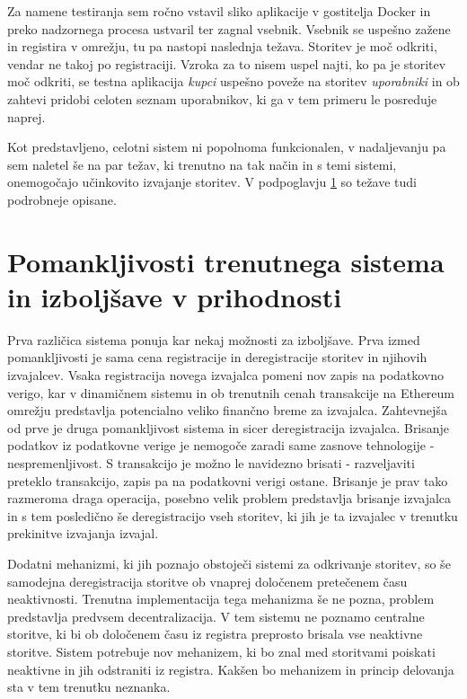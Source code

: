 \documentclass[a4paper, 12pt]{book}
\begin{document}
Za namene testiranja sem ročno vstavil sliko aplikacije v gostitelja Docker in preko nadzornega procesa ustvaril ter zagnal vsebnik.
Vsebnik se uspešno zažene in registira v omrežju, tu pa nastopi naslednja težava.
Storitev je moč odkriti, vendar ne takoj po registraciji.
Vzroka za to nisem uspel najti, ko pa je storitev moč odkriti, se testna aplikacija \textit{kupci} uspešno poveže na storitev \textit{uporabniki} in ob zahtevi pridobi celoten seznam uporabnikov, ki ga v tem primeru le posreduje naprej.

Kot predstavljeno, celotni sistem ni popolnoma funkcionalen, v nadaljevanju pa sem naletel še na par težav, ki trenutno na tak način in s temi sistemi, onemogočajo učinkovito izvajanje storitev.
V podpoglavju \ref{improvments} so težave tudi podrobneje opisane.


\section{Pomankljivosti trenutnega sistema in izboljšave v prihodnosti}
\label{improvments}

Prva različica sistema ponuja kar nekaj možnosti za izboljšave.
Prva izmed pomankljivosti je sama cena registracije in deregistracije storitev in njihovih izvajalcev.
Vsaka registracija novega izvajalca pomeni nov zapis na podatkovno verigo, kar v dinamičnem sistemu in ob trenutnih cenah transakcije na Ethereum omrežju predstavlja potencialno veliko finančno breme za izvajalca.
Zahtevnejša od prve je druga pomankljivost sistema in sicer deregistracija izvajalca.
Brisanje podatkov iz podatkovne verige je nemogoče zaradi same zasnove tehnologije - nespremenljivost.
S transakcijo je možno le navidezno brisati - razveljaviti preteklo transakcijo, zapis pa na podatkovni verigi ostane.
Brisanje je prav tako razmeroma draga operacija, posebno velik problem predstavlja brisanje izvajalca in s tem posledično še deregistracijo vseh storitev, ki jih je ta izvajalec v trenutku prekinitve izvajanja izvajal.

Dodatni mehanizmi, ki jih poznajo obstoječi sistemi za odkrivanje storitev, so še samodejna deregistracija storitve ob vnaprej določenem pretečenem času neaktivnosti.
Trenutna implementacija tega mehanizma še ne pozna, problem predstavlja predvsem decentralizacija.
V tem sistemu ne poznamo centralne storitve, ki bi ob določenem času iz registra preprosto brisala vse neaktivne storitve.
Sistem potrebuje nov mehanizem, ki bo znal med storitvami poiskati neaktivne in jih odstraniti iz registra. Kakšen bo mehanizem in princip delovanja sta v tem trenutku neznanka.
\end{document}
